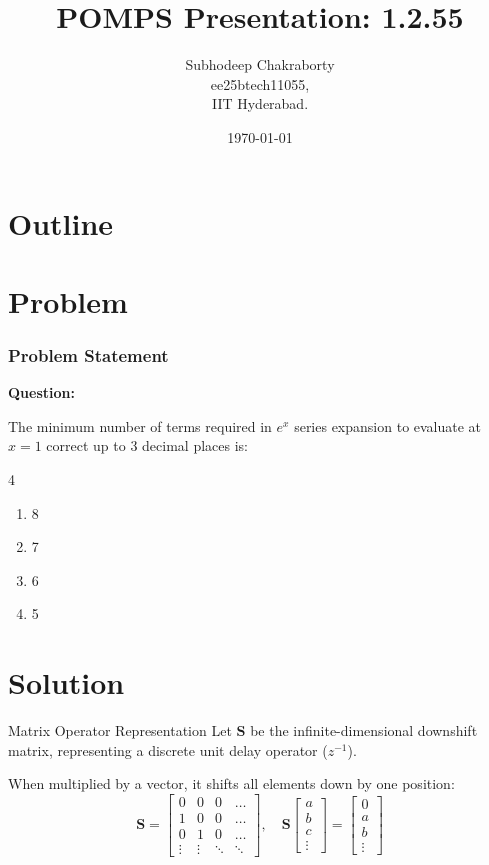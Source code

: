 \documentclass{beamer}
\title{POMPS Presentation: 1.2.55}
\author{Subhodeep Chakraborty \\ ee25btech11055,\\IIT Hyderabad.}
\date{\today}
\numberwithin{equation}{section}
\begin{document}
\begin{frame}
\titlepage
\end{frame}

\section*{Outline}
\begin{frame}
\tableofcontents
\end{frame}

\section{Problem}
\begin{frame}
\frametitle{Problem Statement}
\textbf{Question:} 
\vspace{0.5cm}

The minimum number of terms required in $e^x$ series expansion to evaluate at $x = 1$ correct up to 3 decimal places is:
\begin{multicols}{4}
  \begin{enumerate}
    \item 8
    \item 7
    \item 6
    \item 5
  \end{enumerate}
\end{multicols}
\end{frame}

\section{Solution}
\begin{frame}{Matrix Operator Representation}
Let $\mathbf{S}$ be the infinite-dimensional downshift matrix, representing a discrete unit delay operator ($z^{-1}$). 
\vspace{0.5cm}

When multiplied by a vector, it shifts all elements down by one position:
\begin{equation}
    \mathbf{S} = \begin{bmatrix} 0 & 0 & 0 & \dots \\ 1 & 0 & 0 & \dots \\ 0 & 1 & 0 & \dots \\ \vdots & \vdots & \ddots & \ddots \end{bmatrix}, \quad \mathbf{S} \begin{bmatrix} a \\ b \\ c \\ \vdots \end{bmatrix} = \begin{bmatrix} 0 \\ a \\ b \\ \vdots \end{bmatrix}
\end{equation}
\end{frame}
\end{document}
